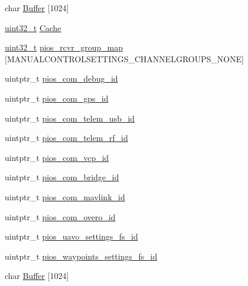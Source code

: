 \begin{DoxyCompactItemize}
\item 
char \hyperlink{group___open_pilot_core_gaaf1490d688e7cf0c41987d87572ff80a}{Buffer} \mbox{[}1024\mbox{]}
\item 
\hyperlink{stdint_8h_a435d1572bf3f880d55459d9805097f62}{uint32\-\_\-t} \hyperlink{group___open_pilot_core_gaef8c3e152589675df7f5b49cc1ba7ffd}{Cache}
\item 
\hyperlink{stdint_8h_a435d1572bf3f880d55459d9805097f62}{uint32\-\_\-t} \hyperlink{group___open_pilot_core_ga6c6cfc16eb738e47c123298e062297e2}{pios\-\_\-rcvr\-\_\-group\-\_\-map} \mbox{[}M\-A\-N\-U\-A\-L\-C\-O\-N\-T\-R\-O\-L\-S\-E\-T\-T\-I\-N\-G\-S\-\_\-\-C\-H\-A\-N\-N\-E\-L\-G\-R\-O\-U\-P\-S\-\_\-\-N\-O\-N\-E\mbox{]}
\item 
uintptr\-\_\-t \hyperlink{group___open_pilot_core_ga14dc9e3d330b80a37a9699c2112358e0}{pios\-\_\-com\-\_\-debug\-\_\-id}
\item 
uintptr\-\_\-t \hyperlink{group___open_pilot_core_ga05dca72c42c6c2b33fa62b8ee0fcb2ea}{pios\-\_\-com\-\_\-gps\-\_\-id}
\item 
uintptr\-\_\-t \hyperlink{group___open_pilot_core_ga513cc36d72b76de2fcb75ff233a79a4a}{pios\-\_\-com\-\_\-telem\-\_\-usb\-\_\-id}
\item 
uintptr\-\_\-t \hyperlink{group___open_pilot_core_gae48e848f715b08971e23528feee79339}{pios\-\_\-com\-\_\-telem\-\_\-rf\-\_\-id}
\item 
uintptr\-\_\-t \hyperlink{group___open_pilot_core_gaaeb3e0d65ed5c6e7b921c54e1ad905db}{pios\-\_\-com\-\_\-vcp\-\_\-id}
\item 
uintptr\-\_\-t \hyperlink{group___open_pilot_core_gac040f05fa048688ee0269c2768698a14}{pios\-\_\-com\-\_\-bridge\-\_\-id}
\item 
uintptr\-\_\-t \hyperlink{group___open_pilot_core_gabdefeb92517c08b2db19b764db941de9}{pios\-\_\-com\-\_\-mavlink\-\_\-id}
\item 
uintptr\-\_\-t \hyperlink{group___open_pilot_core_ga048f2bb98de60944f135effb407a1139}{pios\-\_\-com\-\_\-overo\-\_\-id}
\item 
uintptr\-\_\-t \hyperlink{group___open_pilot_core_gab060f441dd600b08386c0ca1b487217a}{pios\-\_\-uavo\-\_\-settings\-\_\-fs\-\_\-id}
\item 
uintptr\-\_\-t \hyperlink{group___open_pilot_core_ga4b04979e5fb31eaa66088178605835cd}{pios\-\_\-waypoints\-\_\-settings\-\_\-fs\-\_\-id}
\item 
char \hyperlink{group___open_pilot_core_gaaf1490d688e7cf0c41987d87572ff80a}{Buffer} \mbox{[}1024\mbox{]}
\item 

\end{DoxyCompactItemize}
